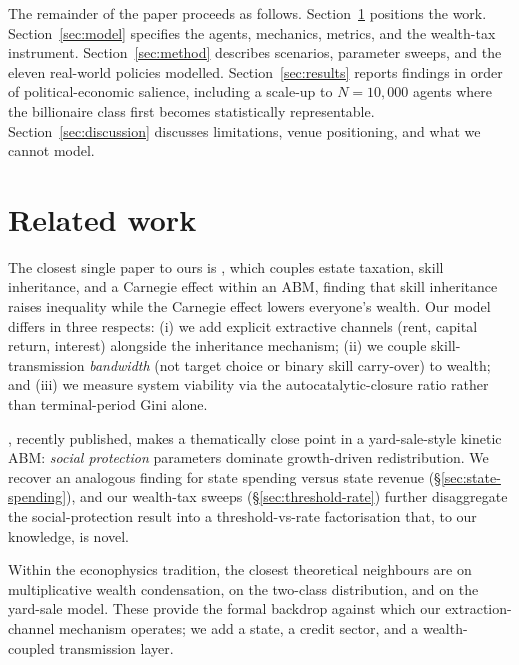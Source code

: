 \documentclass[11pt]{article}
\begin{document}
The remainder of the paper proceeds as follows. Section~\ref{sec:related}
positions the work. Section~\ref{sec:model} specifies the agents,
mechanics, metrics, and the wealth-tax instrument. Section~\ref{sec:method}
describes scenarios, parameter sweeps, and the eleven real-world policies
modelled. Section~\ref{sec:results} reports findings in order of
political-economic salience, including a scale-up to $N=10{,}000$ agents
where the billionaire class first becomes statistically representable.
Section~\ref{sec:discussion} discusses limitations, venue positioning,
and what we cannot model.

\section{Related work}
\label{sec:related}

The closest single paper to ours is \citet{spangler2022distribution},
which couples estate taxation, skill inheritance, and a Carnegie
effect within an ABM, finding that skill inheritance raises inequality
while the Carnegie effect lowers everyone's wealth. Our model differs
in three respects: (i) we add explicit extractive channels (rent,
capital return, interest) alongside the inheritance mechanism;
(ii) we couple skill-transmission \emph{bandwidth} (not target choice
or binary skill carry-over) to wealth; and (iii) we measure system
viability via the autocatalytic-closure ratio rather than terminal-period
Gini alone.

\citet{cardoso2025wealth}, recently published, makes a thematically
close point in a yard-sale-style kinetic ABM: \emph{social protection}
parameters dominate growth-driven redistribution. We recover an analogous
finding for state spending versus state revenue (\S\ref{sec:state-spending}),
and our wealth-tax sweeps (\S\ref{sec:threshold-rate}) further
disaggregate the social-protection result into a threshold-vs-rate
factorisation that, to our knowledge, is novel.

Within the econophysics tradition, the closest theoretical neighbours
are \citet{bouchaud2000wealth} on multiplicative wealth condensation,
\citet{yakovenko2009colloquium} on the two-class distribution, and
\citet{boghosian2017oligarchy} on the yard-sale model. These provide
the formal backdrop against which our extraction-channel mechanism
operates; we add a state, a credit sector, and a wealth-coupled
transmission layer.
\end{document}
